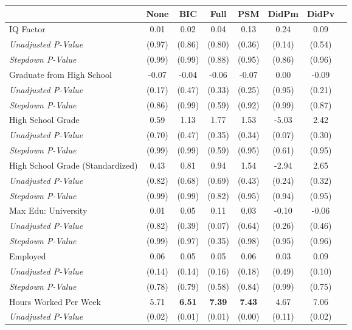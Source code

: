 \begin{tabular}{l c c c c c c c}
\toprule
 & None & BIC & Full & PSM & DidPm & DidPv \\
\midrule
IQ Factor & 0.01 & 0.02 & 0.04 & 0.13 & 0.24 & 0.09 \\
\quad \textit{Unadjusted P-Value} & (0.97) & (0.86) & (0.80) & (0.36) & (0.14) & (0.54) \\
\quad \textit{Stepdown P-Value} & (0.99) & (0.99) & (0.88) & (0.95) & (0.86) & (0.96) \\
Graduate from High School & -0.07 & -0.04 & -0.06 & -0.07 & 0.00 & -0.09 \\
\quad \textit{Unadjusted P-Value} & (0.17) & (0.47) & (0.33) & (0.25) & (0.95) & (0.21) \\
\quad \textit{Stepdown P-Value} & (0.86) & (0.99) & (0.59) & (0.92) & (0.99) & (0.87) \\
High School Grade & 0.59 & 1.13 & 1.77 & 1.53 & -5.03 & 2.42 \\
\quad \textit{Unadjusted P-Value} & (0.70) & (0.47) & (0.35) & (0.34) & (0.07) & (0.30) \\
\quad \textit{Stepdown P-Value} & (0.99) & (0.99) & (0.59) & (0.95) & (0.61) & (0.95) \\
High School Grade (Standardized) & 0.43 & 0.81 & 0.94 & 1.54 & -2.94 & 2.65 \\
\quad \textit{Unadjusted P-Value} & (0.82) & (0.68) & (0.69) & (0.43) & (0.24) & (0.32) \\
\quad \textit{Stepdown P-Value} & (0.99) & (0.99) & (0.82) & (0.95) & (0.94) & (0.95) \\
Max Edu: University & 0.01 & 0.05 & 0.11 & 0.03 & -0.10 & -0.06 \\
\quad \textit{Unadjusted P-Value} & (0.82) & (0.39) & (0.07) & (0.64) & (0.26) & (0.46) \\
\quad \textit{Stepdown P-Value} & (0.99) & (0.97) & (0.35) & (0.98) & (0.95) & (0.96) \\
Employed & 0.06 & 0.05 & 0.05 & 0.06 & 0.03 & 0.09 \\
\quad \textit{Unadjusted P-Value} & (0.14) & (0.14) & (0.16) & (0.18) & (0.49) & (0.10) \\
\quad \textit{Stepdown P-Value} & (0.78) & (0.79) & (0.58) & (0.84) & (0.99) & (0.75) \\
Hours Worked Per Week & 5.71 & \textbf{ 6.51 } & \textbf{ 7.39 } & \textbf{ 7.43 } & 4.67 & 7.06 \\
\quad \textit{Unadjusted P-Value} & (0.02) & (0.01) & (0.01) & (0.00) & (0.11) & (0.02) \\

\end{tabular}
